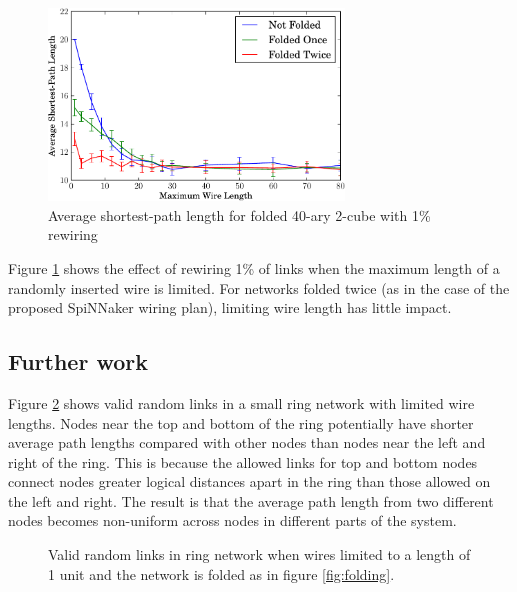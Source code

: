			\begin{figure}
				\center
				\includegraphics[width=0.7\textwidth]{figures/smallWorldLimitedWiring}
				\caption{Average shortest-path length for folded 40-ary 2-cube with 1\%
				rewiring}
				\label{fig:smallWorldLimitedWiring}
			\end{figure}
			
			Figure \ref{fig:smallWorldLimitedWiring} shows the effect of rewiring 1\%
			of links when the maximum length of a randomly inserted wire is limited.
			For networks folded twice (as in the case of the proposed SpiNNaker wiring
			plan), limiting wire length has little impact.
		
		\subsection{Further work}
			
			Figure \ref{fig:ringNetworkLimitedWires} shows valid random links in a
			small ring network with limited wire lengths. Nodes near the top and
			bottom of the ring potentially have shorter average path lengths compared
			with other nodes than nodes near the left and right of the ring. This is
			because the allowed links for top and bottom nodes connect nodes greater
			logical distances apart in the ring than those allowed on the left and
			right. The result is that the average path length from two different nodes
			becomes non-uniform across nodes in different parts of the system.
			
			\begin{figure}
				\center
				
				\caption[Valid random links in a folded ring network with short
				wires.]{Valid random links in ring network when wires limited to a
				length of 1 unit and the network is folded as in figure
				\ref{fig:folding}.}
				\label{fig:ringNetworkLimitedWires}
			\end{figure}
			
